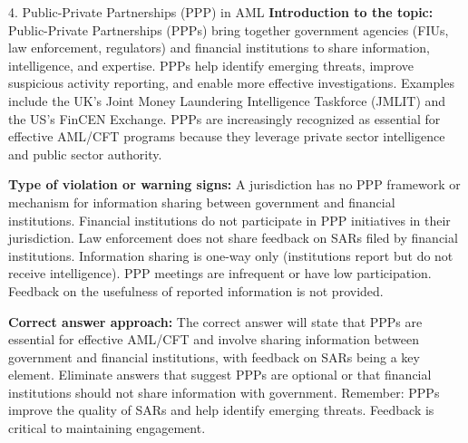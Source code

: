 \documentclass[11pt,a4paper]{beamer}
\begin{document}
\begin{frame}{4. Public-Private Partnerships (PPP) in AML}
\tiny
\noindent\textbf{Introduction to the topic:} Public-Private Partnerships (PPPs) bring together government agencies (FIUs, law enforcement, regulators) and financial institutions to share information, intelligence, and expertise. PPPs help identify emerging threats, improve suspicious activity reporting, and enable more effective investigations. Examples include the UK's Joint Money Laundering Intelligence Taskforce (JMLIT) and the US's FinCEN Exchange. PPPs are increasingly recognized as essential for effective AML/CFT programs because they leverage private sector intelligence and public sector authority.

\vspace{0.1cm}
\noindent\textbf{Type of violation or warning signs:} A jurisdiction has no PPP framework or mechanism for information sharing between government and financial institutions. Financial institutions do not participate in PPP initiatives in their jurisdiction. Law enforcement does not share feedback on SARs filed by financial institutions. Information sharing is one-way only (institutions report but do not receive intelligence). PPP meetings are infrequent or have low participation. Feedback on the usefulness of reported information is not provided.

\vspace{0.1cm}
\noindent\textbf{Correct answer approach:} The correct answer will state that PPPs are essential for effective AML/CFT and involve sharing information between government and financial institutions, with feedback on SARs being a key element. Eliminate answers that suggest PPPs are optional or that financial institutions should not share information with government. Remember: PPPs improve the quality of SARs and help identify emerging threats. Feedback is critical to maintaining engagement.
\end{frame}
\end{document}
